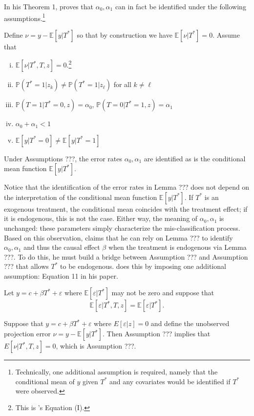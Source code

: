 In his Theorem 1, \cite{Mahajan} proves that $\alpha_0, \alpha_1$ can in fact be identified under the following assumptions.\footnote{Technically, one additional assumption is required, namely that the conditional mean of $y$ given $T^*$ and any covariates would be identified if $T^*$ were observed.}
\begin{assump}[Mahajan A1] Define $\nu = y - \mathbb{E}[y|T^*]$ so that by construction we have $\mathbb{E}[\nu|T^*]=0$. Assume that
  \begin{enumerate}[(i)]
    \item $\mathbb{E}[\nu|T^*,T,z] = 0$.\footnote{This is \citeauthor{Mahajan}'s Equation (I).}
    \item $\mathbb{P}(T^*=1|z_k)\neq \mathbb{P}(T^*=1|z_\ell)$ for all $k\neq \ell$
    \item $\mathbb{P}(T = 1| T^* = 0, z) = \alpha_0$,  $\mathbb{P}(T = 0| T^* = 1, z) = \alpha_1$
    \item $\alpha_0 + \alpha_1 < 1$
    \item $\mathbb{E}[y|T^*=0]\neq \mathbb{E}[y|T^*=1]$
  \end{enumerate}
\end{assump}
\begin{lem}
  Under Assumptions ???, the error rates $\alpha_0, \alpha_1$ are identified as is the conditional mean function $\mathbb{E}[y|T^*]$.
\end{lem}

Notice that the identification of the error rates in Lemma ??? does not depend on the interpretation of the conditional mean function $\mathbb{E}[y|T^*]$.
If $T^*$ is an exogenous treatment, the conditional mean coincides with the treatment effect; if it is endogenous, this is not the case.
Either way, the meaning of $\alpha_0, \alpha_1$ is unchanged: these parameters simply characterize the mis-classification process. 
Based on this observation, \cite{Mahajan} claims that he can rely on Lemma ??? to identify $\alpha_0,\alpha_1$ and thus the causal effect $\beta$ when the treatment is endogenous via Lemma ???.
To do this, he must build a bridge between Assumption ??? and Assumption ??? that allows $T^*$ to be endogenous.
\cite{Mahajan} does this by imposing one additional assumption: Equation 11 in his paper.
\begin{assump}
  Let $y = c + \beta T^* + \varepsilon$ where $\mathbb{E}[\varepsilon|T^*]$ may not be zero and suppose that 
  \[\mathbb{E}[\varepsilon|T^*,T,z] = \mathbb{E}[\varepsilon|T^*].\]
\end{assump}
\begin{lem}
  Suppose that $y = c + \beta T^* + \varepsilon$ where $E[\varepsilon|z]=0$ and define the unobserved projection error $\nu = y - \mathbb{E}[y|T^*]$.
  Then Assumption ??? implies that $E[\nu|T^*,T,z]=0$, which is Assumption ???.
\end{lem}

